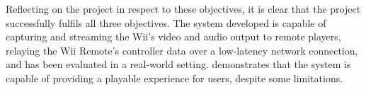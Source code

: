 Reflecting on the project in respect to these objectives, it is clear that the
project successfully fulfils all three objectives. The system developed is
capable of capturing and streaming the Wii’s video and audio output to remote
players, relaying the Wii Remote’s controller data over a low-latency network
connection, and has been evaluated in a real-world setting.  demonstrates that the system is capable of
providing a playable experience for users, despite some limitations.



